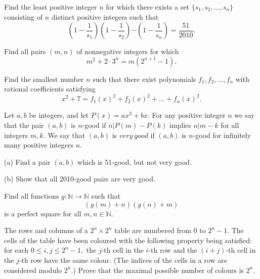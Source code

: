 \item[\textbf{N1.}]
Find the least positive integer 
$n$
 for which there exists a set 
$\{s_1, s_2, \ldots , s_n\}$
 consisting of 
$n$
 distinct positive integers such that
\[ \left( 1 - \frac{1}{s_1} \right) \left( 1 - \frac{1}{s_2} \right) \cdots \left( 1 - \frac{1}{s_n} \right) = \frac{51}{2010}.\]

\item[\textbf{N2.}]
Find all pairs 
$(m,n)$
 of nonnegative integers for which 
\[m^2 + 2 \cdot 3^n = m\left(2^{n+1} - 1\right).\]

\item[\textbf{N3.}]
Find the smallest number 
$n$
 such that there exist polynomials 
$f_1, f_2, \ldots , f_n$
 with rational coefficients satisfying 
\[x^2+7 = f_1\left(x\right)^2 + f_2\left(x\right)^2 + \ldots + f_n\left(x\right)^2.\]

\item[\textbf{N4.}]
Let 
$a, b$
 be integers, and let 
$P(x) = ax^3+bx.$
 For any positive integer 
$n$
 we say that the pair 
$(a,b)$
 is 
$n$-good if 
$n | P(m)-P(k)$
 implies 
$n | m - k$
 for all integers 
$m, k.$
 We say that 
$(a,b)$
 is 
$very \ good$
 if 
$(a,b)$
 is 
$n$-good for infinitely many positive integers 
$n.$

(a)
 Find a pair 
$(a,b)$
 which is 51-good, but not very good.
 
(b)
 Show that all 2010-good pairs are very good.

\item[\textbf{N5.}]
Find all functions 
$g:\mathbb{N}\rightarrow\mathbb{N}$
 such that 
\[\left(g(m)+n\right)\left(g(n)+m\right)\]
 is a perfect square for all 
$m,n\in\mathbb{N}.$

\item[\textbf{N6.}]
The rows and columns of a 
$2^n \times 2^n$
 table are numbered from 
$0$
 to 
$2^{n}-1.$
 The cells of the table have been coloured with the following property being satisfied: for each 
$0 \leq i,j \leq 2^n - 1,$
 the 
$j$-th cell in the 
$i$-th row and the 
$(i+j)$-th cell in the 
$j$-th row have the same colour. (The indices of the cells in a row are considered modulo 
$2^n$.) Prove that the maximal possible number of colours is 
$2^n$.
